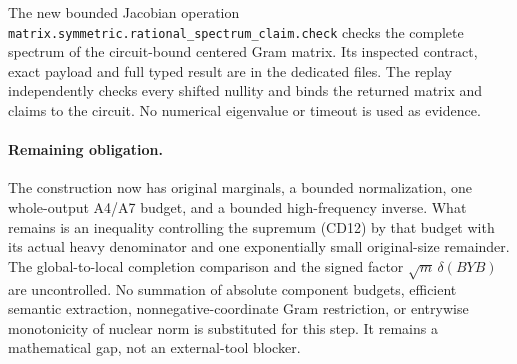 \documentclass[11pt]{article}
\begin{document}
The new bounded Jacobian operation
\texttt{matrix.symmetric.rational\_spectrum\_claim.check} checks
the complete spectrum of the circuit-bound centered Gram matrix.
Its inspected contract, exact payload and full typed result are in
the dedicated  files. The replay
independently checks every shifted nullity and binds the returned
matrix and claims to the circuit. No numerical eigenvalue or timeout
is used as evidence.

\paragraph{Remaining obligation.}
The construction now has original marginals, a bounded normalization,
one whole-output A4/A7 budget, and a bounded high-frequency inverse.
What remains is an inequality controlling the supremum (CD12) by
that budget with its actual heavy denominator and one exponentially
small original-size remainder. The global-to-local completion
comparison and the signed factor $\sqrt m\,\delta(BYB)$ are
uncontrolled. No summation of absolute component budgets, efficient
semantic extraction, nonnegative-coordinate Gram restriction, or
entrywise monotonicity of nuclear norm is substituted for this step.
It remains a mathematical gap, not an external-tool blocker.
\end{document}

